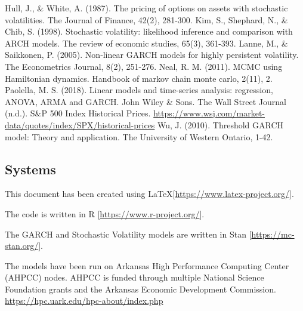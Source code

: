 \documentclass[12pt,letterpaper,reqno,fleqn]{article}
\begin{document}
\flushleft Hull, J., \& White, A. (1987). The pricing of options on assets with stochastic volatilities. The Journal of Finance, 42(2), 281-300.
\flushleft Kim, S., Shephard, N., \& Chib, S. (1998). Stochastic volatility: likelihood inference and comparison with ARCH models. The review of economic studies, 65(3), 361-393.
\flushleft Lanne, M., \& Saikkonen, P. (2005). Non‐linear GARCH models for highly persistent volatility. The Econometrics Journal, 8(2), 251-276.
\flushleft Neal, R. M. (2011). MCMC using Hamiltonian dynamics. Handbook of markov chain monte carlo, 2(11), 2.
\flushleft Paolella, M. S. (2018). Linear models and time-series analysis: regression, ANOVA, ARMA and GARCH. John Wiley \& Sons.
\flushleft The Wall Street Journal (n.d.). S\&P 500 Index Historical Prices. \href{https://www.wsj.com/market-data/quotes/index/SPX/historical-prices}{https://www.wsj.com/market-data/quotes/index/SPX/historical-prices}
\flushleft Wu, J. (2010). Threshold GARCH model: Theory and application. The University of Western Ontario, 1-42.

\subsection*{Systems}

\flushleft This document has been created using \LaTeX   [\href{https://www.latex-project.org/}{https://www.latex-project.org/}]. 

The code is written in R [\href{https://www.r-project.org/}{https://www.r-project.org/}].

The GARCH and Stochastic Volatility models are written in Stan [\href{https://mc-stan.org/}{https://mc-stan.org/}].

The models have been run on Arkansas High Performance Computing Center (AHPCC) nodes. AHPCC is funded through multiple National Science Foundation grants and the Arkansas Economic Development Commission. \href{https://hpc.uark.edu/hpc-about/index.php}{https://hpc.uark.edu/hpc-about/index.php}
\end{document}
